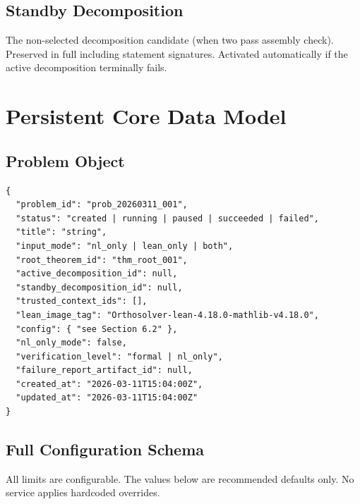 \documentclass[11pt,a4paper]{article}
\begin{document}
\subsection{Standby Decomposition}
The non-selected decomposition candidate (when two pass assembly check). Preserved in full including statement signatures. Activated automatically if the active decomposition terminally fails.

\section{Persistent Core Data Model}

\subsection{Problem Object}

\begin{lstlisting}
{
  "problem_id": "prob_20260311_001",
  "status": "created | running | paused | succeeded | failed",
  "title": "string",
  "input_mode": "nl_only | lean_only | both",
  "root_theorem_id": "thm_root_001",
  "active_decomposition_id": null,
  "standby_decomposition_id": null,
  "trusted_context_ids": [],
  "lean_image_tag": "Orthosolver-lean-4.18.0-mathlib-v4.18.0",
  "config": { "see Section 6.2" },
  "nl_only_mode": false,
  "verification_level": "formal | nl_only",
  "failure_report_artifact_id": null,
  "created_at": "2026-03-11T15:04:00Z",
  "updated_at": "2026-03-11T15:04:00Z"
}
\end{lstlisting}

\subsection{Full Configuration Schema}
\label{sec:config}

All limits are configurable. The values below are recommended defaults only. No service applies hardcoded overrides.
\end{document}
